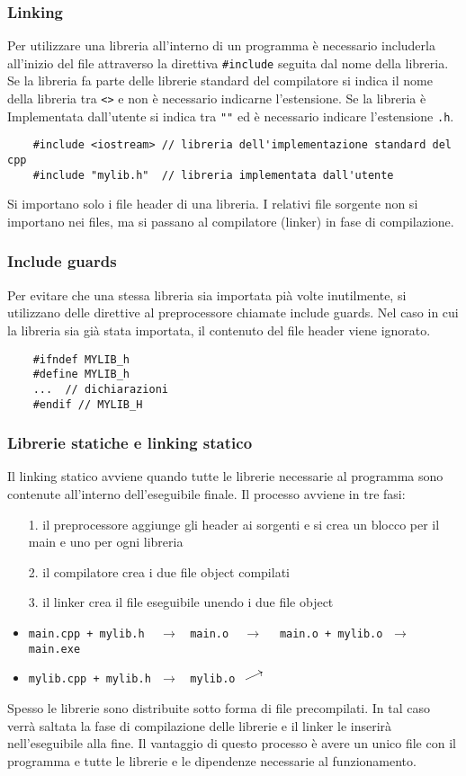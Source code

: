 \documentclass[a4paper]{article}
\newcommand{\toprightarrow}{\mathrel{\raisebox{0.25 em}{\rotatebox[origin=c]{25}{$\longrightarrow$}}}} %
\begin{document}
\subsubsection*{Linking}
Per utilizzare una libreria all'interno di un programma è necessario includerla all'inizio del file attraverso la direttiva
\verb|#include| seguita dal nome della libreria. Se la libreria fa parte delle librerie standard del compilatore si indica il nome
della libreria tra \verb|<>| e non è necessario indicarne l'estensione. Se la libreria è Implementata dall'utente si indica tra
\verb|""| ed è necessario indicare l'estensione \verb|.h|.
\begin{lstlisting}
	#include <iostream> // libreria dell'implementazione standard del cpp
	#include "mylib.h"  // libreria implementata dall'utente
\end{lstlisting}
Si importano solo i file header di una libreria. I relativi file sorgente non si importano nei files, ma si passano al compilatore
(linker) in fase di compilazione.

\subsubsection*{Include guards}
Per evitare che una stessa libreria sia importata pià volte inutilmente, si utilizzano delle direttive al preprocessore chiamate
include guards. Nel caso in cui la libreria sia già stata importata, il contenuto del file header viene ignorato.
\begin{lstlisting}
	#ifndef MYLIB_h
	#define MYLIB_h
	...  // dichiarazioni
	#endif // MYLIB_H
\end{lstlisting}

\subsubsection*{Librerie statiche e linking statico}
Il linking statico avviene quando tutte le librerie necessarie al programma sono contenute all'interno dell'eseguibile finale. Il
processo avviene in tre fasi:
\begin{itemize}[topsep=0pt]
	\item[1.] il preprocessore aggiunge gli header ai sorgenti e si crea un blocco per il main e uno per ogni libreria
	\item[2.] il compilatore crea i due file object compilati
	\item[3.] il linker crea il file eseguibile unendo i due file object
	\item \verb|main.cpp + mylib.h| \(\;\;\;\rightarrow\;\;\) \verb|main.o| \(\;\;\;\longrightarrow\quad\) \verb|main.o + mylib.o| \(\;\rightarrow\;\) \verb|main.exe|
	\item \verb|mylib.cpp + mylib.h| \(\,\,\rightarrow\;\;\) \verb|mylib.o| \(\,\,\toprightarrow\)
\end{itemize}
Spesso le librerie sono distribuite sotto forma di file precompilati. In tal caso verrà saltata la fase di compilazione delle
librerie e il linker le inserirà nell'eseguibile alla fine. Il vantaggio di questo processo è avere un unico file con il programma
e tutte le librerie e le dipendenze necessarie al funzionamento.
\end{document}
